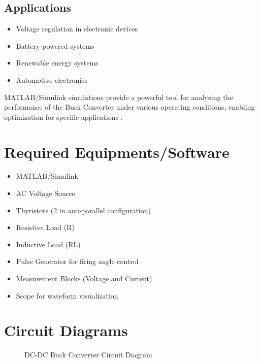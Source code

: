 \documentclass[12pt]{article}
\begin{document}
\subsection*{Applications}
\begin{itemize}
    \item Voltage regulation in electronic devices
    \item Battery-powered systems
    \item Renewable energy systems
    \item Automotive electronics
\end{itemize}

MATLAB/Simulink simulations provide a powerful tool for analyzing the performance of the Buck Converter under various operating conditions, enabling optimization for specific applications \cite{mathworks2023simulink}.


\section*{Required Equipments/Software}
\begin{itemize}
    \item MATLAB/Simulink
    \item AC Voltage Source
    \item Thyristors (2 in anti-parallel configuration)
    \item Resistive Load (R)
    \item Inductive Load (RL)
    \item Pulse Generator for firing angle control
    \item Measurement Blocks (Voltage and Current)
    \item Scope for waveform visualization
\end{itemize}

\section*{Circuit Diagrams}
\begin{figure}[H]
    \centering
    \caption{DC-DC Buck Converter Circuit Diagram}
\end{figure}
\end{document}
